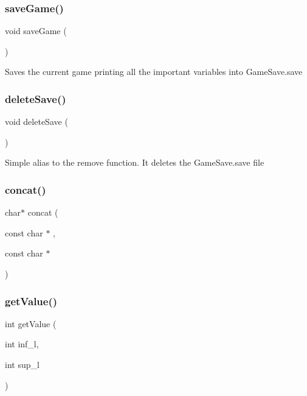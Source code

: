 \subsubsection{\texorpdfstring{save\+Game()}{saveGame()}}
{\footnotesize\ttfamily void save\+Game (\begin{DoxyParamCaption}{ }\end{DoxyParamCaption})\hspace{0.3cm}{\ttfamily [static]}}

Saves the current game printing all the important variables into Game\+Save.\+save \mbox{\label{group__system_ga64ff5e40fc2d7ff1139ef10c5598f123}} 
\subsubsection{\texorpdfstring{delete\+Save()}{deleteSave()}}
{\footnotesize\ttfamily void delete\+Save (\begin{DoxyParamCaption}{ }\end{DoxyParamCaption})\hspace{0.3cm}{\ttfamily [static]}}

Simple alias to the remove function. It deletes the Game\+Save.\+save file \mbox{\label{group__system_ga2ec60b27c8c3eeedecc5a8f2d311d90d}} 
\subsubsection{\texorpdfstring{concat()}{concat()}}
{\footnotesize\ttfamily char$\ast$ concat (\begin{DoxyParamCaption}\item[{const char $\ast$}]{,  }\item[{const char $\ast$}]{ }\end{DoxyParamCaption})}

\mbox{\label{group__system_ga8c7f7faf9cadfc15f2518a2508442fe1}} 
\subsubsection{\texorpdfstring{get\+Value()}{getValue()}}
{\footnotesize\ttfamily int get\+Value (\begin{DoxyParamCaption}\item[{int}]{inf\+\_\+l,  }\item[{int}]{sup\+\_\+l }\end{DoxyParamCaption})}

